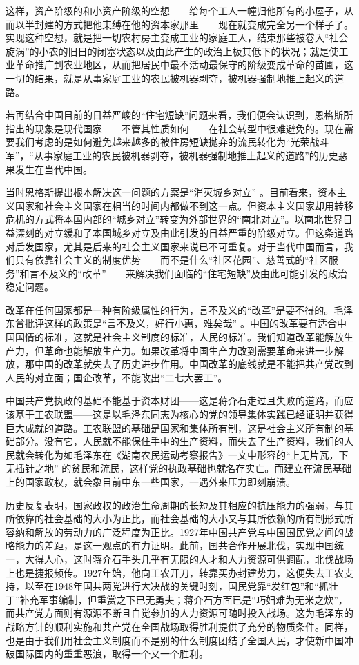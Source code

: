 \documentclass[UTF8, 12pt, a4paper]{ctexrep}
\begin{document}
这样，资产阶级的和小资产阶级的空想——给每个工人一幢归他所有的小屋子，从而以半封建的方式把他束缚在他的资本家那里——现在就变成完全另一个样子了。实现这种空想，就是把一切农村房主变成工业的家庭工人，结束那些被卷入“社会旋涡”的小农的旧日的闭塞状态以及由此产生的政治上极其低下的状况；就是使工业革命推广到农业地区，从而把居民中最不活动最保守的阶级变成革命的苗圃，这一切的结果，就是从事家庭工业的农民被机器剥夺，被机器强制地推上起义的道路。

若再结合中国目前的日益严峻的“住宅短缺”问题来看，我们便会认识到，恩格斯所指出的现象是现代国家——不管其性质如何——在社会转型中很难避免的。现在需要我们考虑的是如何避免越来越多的被住房短缺抛弃的流民转化为“光荣战斗军”，“从事家庭工业的农民被机器剥夺，被机器强制地推上起义的道路”的历史恶果发生在当代中国。

当时恩格斯提出根本解决这一问题的方案是“消灭城乡对立” 。目前看来，资本主义国家和社会主义国家在相当的时间内都做不到这一点。但资本主义国家却用转移危机的方式将本国内部的“城乡对立”转变为外部世界的“南北对立”。以南北世界日益深刻的对立缓和了本国城乡对立及由此引发的日益严重的阶级对立。但这条道路对后发国家，尤其是后来的社会主义国家来说已不可重复。对于当代中国而言，我们只有依靠社会主义的制度优势——而不是什么“社区花园”、慈善式的“社区服务”和言不及义的“改革”——来解决我们面临的“住宅短缺”及由此可能引发的政治稳定问题。

改革在任何国家都是一种有阶级属性的行为，言不及义的“改革”是要不得的。毛泽东曾批评这样的政策是“言不及义，好行小惠，难矣哉” 。中国的改革要有适合中国国情的标准，这就是社会主义制度的标准，人民的标准。我们知道改革能解放生产力，但革命也能解放生产力。如果改革将中国生产力改到需要革命来进一步解放，那中国的改革就失去了历史进步作用。中国改革的底线就是不能把共产党改到人民的对立面；国企改革，不能改出“二七大罢工”。

中国共产党执政的基础不能基于资本财团——这是蒋介石走过且失败的道路，而应该基于工农联盟——这是以毛泽东同志为核心的党的领导集体实践已经证明并获得巨大成就的道路。工农联盟的基础是国家和集体所有制，这是社会主义所有制的基础部分。没有它，人民就不能保住手中的生产资料，而失去了生产资料，我们的人民就会转化为如毛泽东在《湖南农民运动考察报告》一文中形容的“上无片瓦，下无插针之地” 的贫民和流民，这样党的执政基础也就名存实亡。而建立在流民基础上的国家政权，就会象目前中东一些国家，一遇外来压力即刻崩溃。

历史反复表明，国家政权的政治生命周期的长短及其相应的抗压能力的强弱，与其所依靠的社会基础的大小为正比，而社会基础的大小又与其所依赖的所有制形式所容纳和解放的劳动力的广泛程度为正比。1927年中国共产党与中国国民党之间的战略能力的差距，是这一观点的有力证明。此前，国共合作开展北伐，实现中国统一，大得人心，这时蒋介石手头几乎有无限的人才和人力资源可供调配，北伐战场上也是捷报频传。1927年始，他向工农开刀，转靠买办封建势力，这便失去工农支持，以至在1948年国共两党进行大决战的关键时刻，国民党靠“发红包”和“抓壮丁”补充军事编制，但重赏之下已无勇夫；蒋介石方面已是“巧妇难为无米之炊”，而共产党方面则有源源不断且自觉参加的人力资源可随时投入战场。这为毛泽东的战略方针的顺利实施和共产党在全国战场取得胜利提供了充分的物质条件。同样，也是由于我们用社会主义制度而不是别的什么制度团结了全国人民，才使新中国冲破国际国内的重重恶浪，取得一个又一个胜利。
\end{document}
